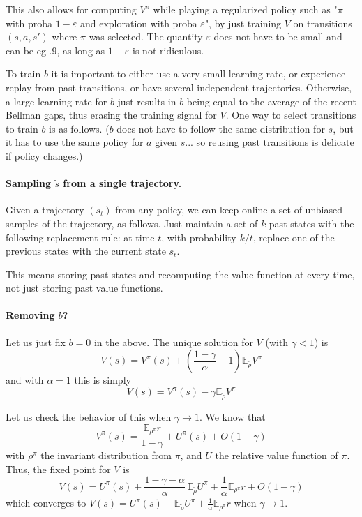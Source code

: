 \documentclass[11pt]{article}
\newcommand{\E}{\mathbb{E}}
\newcommand{\eps}{\varepsilon}
\begin{document}
This also allows for computing $V^\pi$ while playing a regularized policy
such as "$\pi$ with proba $1-\eps$ and exploration with proba $\eps$", by
just training $V$ on transitions $(s,a,s')$ where $\pi$ was selected. The
quantity $\eps$ does not have to be small and can be eg .9, as long as $1-\eps$ is not
ridiculous.

To train $b$ it is important to either use a very small learning rate, or
experience replay from past transitions, or have several independent
trajectories. Otherwise, a large learning rate
for $b$ just results in $b$ being equal to the average of the recent
Bellman gaps, thus erasing the training signal for $V$. One way to select
transitions to train $b$ is as follows. ($b$ does not have to follow the
same distribution for $s$, but it has to use the same policy for $a$
given $s$... so reusing
past transitions is
delicate if policy changes.)

\paragraph{Sampling $\tilde s$ from a single trajectory.} Given a
trajectory $(s_t)$ from any policy, we can keep online a set of unbiased
samples of the trajectory, as follows. Just maintain a set of $k$ past
states with the following replacement rule: at time $t$, with probability
$k/t$, replace one of the previous states with the current state $s_t$.

This means storing past states and recomputing the value function
at every time, not just storing past value functions.

\paragraph{Removing $b$?} Let us just fix $b=0$ in the above. The unique
solution for $V$ (with $\gamma<1$) is
\begin{equation}
V(s)=V^\pi(s)+\left(\frac{1-\gamma}{\alpha}-1\right)\E_{\tilde \rho} V^\pi
\label{eq:relative-td}
\end{equation}
and with $\alpha=1$ this is simply
\begin{equation}
V(s)=V^\pi(s)-\gamma \E_{\tilde \rho} V^\pi
\end{equation}

Let us check the behavior of this when $\gamma\to 1$. We know that
\begin{equation}
V^\pi(s)=\frac{\E_{\rho^\pi}r}{1-\gamma}+U^\pi(s)+O(1-\gamma)
\end{equation}
with $\rho^\pi$ the invariant distribution from $\pi$, and $U$ the
relative value function of $\pi$. Thus, the fixed point for $V$ is
\begin{equation}
V(s)=U^\pi(s)+\frac{1-\gamma-\alpha}{\alpha} \,\E_{\tilde \rho}U^\pi
+\frac1{\alpha} \E_{\rho^\pi}r+O(1-\gamma)
\end{equation}
which converges to $V(s)=U^\pi(s)-\E_{\tilde \rho}U^\pi+\frac1{\alpha}
\E_{\rho^\pi}r$ when $\gamma\to 1$.
\end{document}
